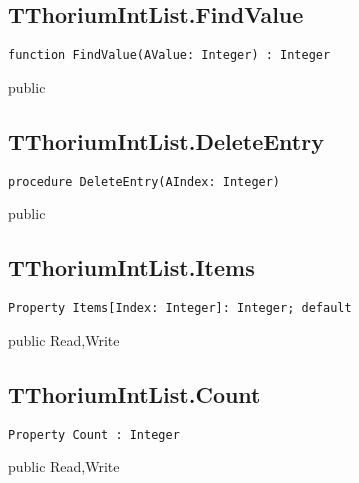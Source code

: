\subsection{TThoriumIntList.FindValue}
\label{thoriumcorepkg:thorium:tthoriumintlist:findvalue}
\begin{FPCList}
\Declaration 

\begin{verbatim}
function FindValue(AValue: Integer) : Integer
\end{verbatim}
\Visibility
public
\end{FPCList}
\subsection{TThoriumIntList.DeleteEntry}
\label{thoriumcorepkg:thorium:tthoriumintlist:deleteentry}
\begin{FPCList}
\Declaration 

\begin{verbatim}
procedure DeleteEntry(AIndex: Integer)
\end{verbatim}
\Visibility
public
\end{FPCList}
\subsection{TThoriumIntList.Items}
\label{thoriumcorepkg:thorium:tthoriumintlist:items}
\begin{FPCList}
\Declaration 

\begin{verbatim}
Property Items[Index: Integer]: Integer; default
\end{verbatim}
\Visibility
public
\Access
Read,Write
\end{FPCList}
\subsection{TThoriumIntList.Count}
\label{thoriumcorepkg:thorium:tthoriumintlist:count}
\begin{FPCList}
\Declaration 

\begin{verbatim}
Property Count : Integer
\end{verbatim}
\Visibility
public
\Access
Read,Write
\end{FPCList}
